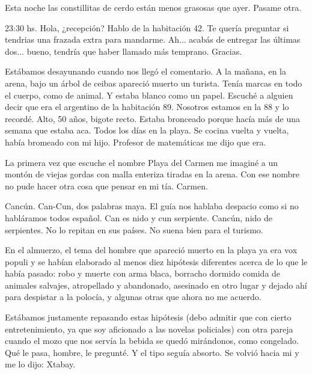 \documentclass[11pt,twoside,openright,a6paper]{book}
\begin{document}
\vspace{1.5cm}
Esta noche las constillitas de cerdo están menos grasosas que ayer. Pasame otra.


\vspace{1.5cm}
23:30 hs. Hola, ¿recepción? Hablo de la habitación 42. Te quería preguntar si tendrias una frazada extra para mandarme. Ah... acabás de entregar las últimas dos... bueno, tendría que haber llamado más temprano. Gracias.


\vspace{1.5cm}
Estábamos desayunando cuando nos llegó el comentario. A la mañana, en la arena, bajo un árbol de ceibas apareció muerto un turista. Tenía marcas en todo el cuerpo, como de animal. Y estaba blanco como un papel. Escuché a alguien decir que era el argentino de la habitación 89. Nosotros estamos en la 88 y lo recordé. Alto, 50 años, bigote recto. Estaba bronceado porque hacía más de una semana que estaba aca. Todos los días en la playa. Se cocina vuelta y vuelta, había bromeado con mi hijo. Profesor de matemáticas me dijo que era.


\vspace{1.5cm}
La primera vez que escuche el nombre Playa del Carmen me imaginé a un montón de viejas gordas con malla enteriza tiradas en la arena. Con ese nombre no pude hacer otra cosa que pensar en mi tía. Carmen.


\vspace{1.5cm}
Cancún. Can-Cun, dos palabras maya. El guía nos hablaba despacio como si no habláramos todos español. Can es nido y cun serpiente. Cancún, nido de serpientes. No lo repitan en sus países. No suena bien para el turismo.


\vspace{1.5cm}
En el almuerzo, el tema del hombre que apareció muerto en la playa ya era vox populi y se habían elaborado al menos diez hipótesis diferentes acerca de lo que le había pasado: robo y muerte con arma blaca, borracho dormido comida de animales salvajes, atropellado y abandonado, asesinado en otro lugar y dejado ahí para despistar a la polocía, y algunas otras que ahora no me acuerdo.

Estábamos justamente repasando estas hipótesis (debo admitir que con cierto entretenimiento, ya que soy aficionado a las novelas policiales) con otra pareja cuando el mozo que nos servía la bebida se quedó mirándonos, como congelado. Qué le pasa, hombre, le pregunté. Y el tipo seguía absorto. Se volvió hacia mi y me lo dijo: Xtabay.
\end{document}
